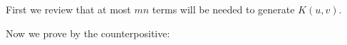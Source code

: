 First we review that at most $mn$ terms will be needed to generate $K(u,v)$.

Now we prove by the counterpositive: 
